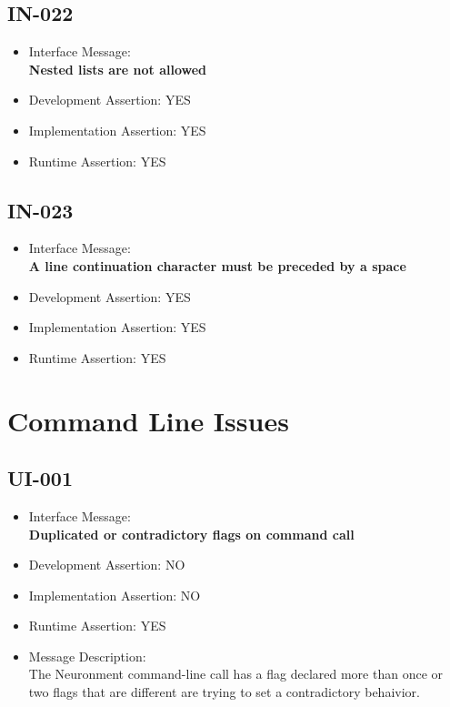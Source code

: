 \subsection{IN-022}
\begin{itemize}
  \item Interface Message:\\[1em]
    \textbf{Nested lists are not allowed}
  \item Development Assertion: YES
  \item Implementation Assertion: YES
  \item Runtime Assertion: YES
\end{itemize}

\subsection{IN-023}
\begin{itemize}
  \item Interface Message:\\[1em]
    \textbf{A line continuation character must be preceded by a space}
  \item Development Assertion: YES
  \item Implementation Assertion: YES
  \item Runtime Assertion: YES
\end{itemize}

\section{Command Line Issues}

\subsection{UI-001}
\begin{itemize}
  \item Interface Message:\\[1em]
    \textbf{Duplicated or contradictory flags on command call}
  \item Development Assertion: NO
  \item Implementation Assertion: NO
  \item Runtime Assertion: YES
  \item Message Description:\\[1em]
    The Neuronment command-line call has a flag declared more than once or two flags that are different are trying to set a contradictory behaivior.
\end{itemize}

